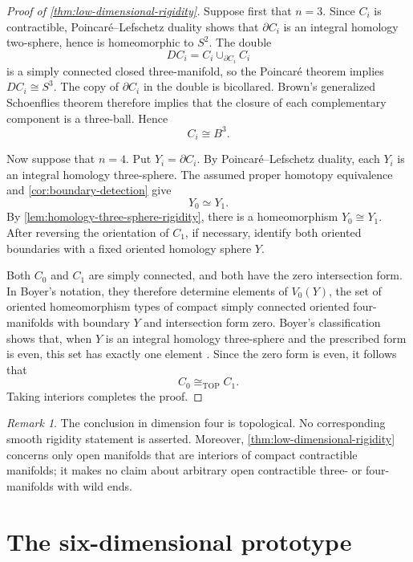 \documentclass[10pt,reqno]{amsart}
\numberwithin{equation}{section}
\theoremstyle{definition}
\theoremstyle{remark}
\newtheorem{remark}{Remark}
\newcommand{\TOP}{\mathrm{TOP}}
\begin{document}
\begin{proof}[Proof of \cref{thm:low-dimensional-rigidity}]
Suppose first that \(n=3\).  Since \(C_i\) is contractible,
Poincar\'e--Lefschetz duality shows that \(\partial C_i\) is an
integral homology two-sphere, hence is homeomorphic to \(S^2\).
The double
\[
D C_i=C_i\cup_{\partial C_i}C_i
\]
is a simply connected closed three-manifold, so the Poincar\'e theorem
implies \(D C_i\cong S^3\).  The copy of \(\partial C_i\) in the
double is bicollared.  Brown's generalized Schoenflies theorem
\cite{BrownSchoenflies} therefore implies that the closure of each
complementary component is a three-ball.  Hence
\[
C_i\cong B^3.
\]

Now suppose that \(n=4\).  Put \(Y_i=\partial C_i\).  By
Poincar\'e--Lefschetz duality, each \(Y_i\) is an integral homology
three-sphere.  The assumed proper homotopy equivalence and
\cref{cor:boundary-detection} give
\[
Y_0\simeq Y_1.
\]
By \cref{lem:homology-three-sphere-rigidity}, there is a homeomorphism
\(Y_0\cong Y_1\).  After reversing the orientation of \(C_1\), if
necessary, identify both oriented boundaries with a fixed oriented
homology sphere \(Y\).

Both \(C_0\) and \(C_1\) are simply connected, and both have the zero
intersection form.  In Boyer's notation, they therefore determine
elements of \(V_0(Y)\), the set of oriented homeomorphism types of
compact simply connected oriented four-manifolds with boundary \(Y\)
and intersection form zero.  Boyer's classification shows that, when
\(Y\) is an integral homology three-sphere and the prescribed form is
even, this set has exactly one element
\cite[Proposition~0.5]{BoyerBoundary}.  Since
the zero form is even, it follows that
\[
C_0\cong_{\TOP}C_1.
\]
Taking interiors completes the proof.
\end{proof}

\begin{remark}
The conclusion in dimension four is topological.  No corresponding
smooth rigidity statement is asserted.  Moreover,
\cref{thm:low-dimensional-rigidity} concerns only open manifolds that
are interiors of compact contractible manifolds; it makes no claim
about arbitrary open contractible three- or four-manifolds with wild
ends.
\end{remark}

\section{The six-dimensional prototype}
\label{sec:six-dimensional-prototype}
\end{document}
